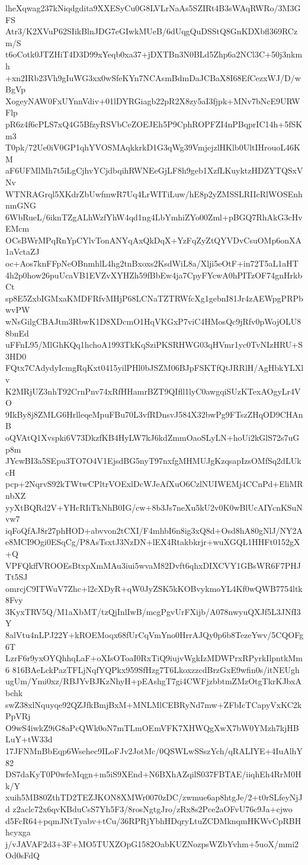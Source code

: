 lheXqwag237kNiqdgdita9XXESyCu0G8LVLrNaAs5SZIRt4B3sWAqRWRo/3M3GFS
Atr3/K2XVuP62SIikBlnJDG7eGIwkMUeB/6dUqgQuDSStQ8GnKDXbfl369RCzm/S
t6oCotk0JTZHiT4D3D99xYeqb0xa37+jDXTBn3N0BLd5Zhp6a2NCl3C+50j3nkmh
+xn2IRb23Vh9gIuWG3xx0wSfeKYn7NCAsmBdmDaJCBaX8I68EfCezxWJ/D/wBgVp
XogeyNAW0FxUYnnVdiv+01lDYRGiagb22pR2X8zy5aI3fjpk+MNv7bNcE9URWFlp
pR6z4f6cPLS7xQ4G5BfzyRSVbCeZOEJEh5P9CphROPFZI4nPBqprIC14h+5fSKm3
T0pk/72Ue0iV0GP1qhYVOSMAqkkrkD1G3qWg39VmjejzlHKlb0UltIHrouoL46KM
aF6UFMlMh7t5iLgCjhvYCjdbqihRWNEeGjLF8h9geb1XzfLKuyktzHDZYTQSxVNv
WTNRAGrql5XKdrZbUwfmwR7Uq4LrWITiLuw/hE8p2yZMSSLRIIcRlWOSEnhnmGNG
6WbRueL/6iknTZgALhWzfYhW4qd1ng4LbYmhiZYo00Zml+pBGQ7RhAkG3cHvEMcm
OCsBWrMPqRnYpCYlvTonANYqAxQkDqX+YzFqZyZtQYVDvCsuOMp6onXA1aVctaZJ
oc+Aos7knFFpNeOBnmhlL4hg2tnBxoxs2KsdWiL8a/Xlji5eOtF+in72T5aL1aHT
4h2p0how26puUcaVB1EVZvXYHZh59fBbEw4ja7CpyFYcwA0hPITzOF74gnHrkbCt
sp8E5ZxbIGMxaKMDFRfvMHjP68LCNaTZTRWfcXg1gebnI81Jr4zAEWpgPRPbwvPW
wNsGilgCBAJtm3RbwK1D8XDcmO1HqVKGxP7viC4HMosQc9jRfv0pWojOLU88bnEd
uFFnL95/MlGhKQq1hchoA1993TkKqSziPKSRHWG03qHVmr1yc0TvNIzHRU+S3HD0
FQtx7CAdydyIcmgRqKxt0415yilPHl0bJSZM06BJpFSKTfQtJRRlH/AgHbkYLXlv
K2MRjUZ3nhT92CrnPnv74xRfHHamrBZT9QIfll1lyC0awgqiSUzKTexAOgyLr4VO
9IkBy8j8ZMLG6HrlleqeMpuFBu70L3vfRDnsvJ584X32bwPg9FTszZHqOD9CHAnB
oQVAtQ1Xvspki6V73DkzfKB4HyLW7kJ6kdZmmOaoSLyLN+hoUi2kGlS72s7uGp8m
JYcwBI3a5SEpu3TO7O4V1EjsdBG5nyT97nxfgMHMUJgKzqsapIzsOMfSq2dLUkcH
pcp+2NqrvS92kTWtwCPltrVOExlDcWJeAfXuO6CzlNUIWEMj4CCnPd+EliMRnbXZ
yyXtBQRd2V+YHcRIiTkNhB0IG/cw+8b3Js7neXu5kU2v0K0wBlUcAIYcnKSuNvw7
iqFoQfAJ8r27phHOD+abvvon2tCXI/F4mhbI6n8ig3xQ8d+Osd8hA80gNlJ/NY2A
e8MCI9Ogi0ESqCg/P8AsTsxtJ3NzDN+lEX4Rtakbkrjr+wuXGQL1HHFt0152gX+Q
VPFQkffVROOEsBtxpXmMAu3iui5wvaM82Dvft6qhxDIXCVY1GBsWR6F7PHJTt5SJ
omrcjC9ITWuV7Zhc+l2cXDyR+qW0JyZSK5kKOBvykmoYL4Kf0wQWB7754ltk8Fvy
3KyxTRV5Q/M1aXbMT/tzQjInlIwB/mcgPgvUrFXijb/A078nwyuQXJf5L3JNfI3Y
8alVtu4nLPJ22Y+kROEMoqx68fUrCqVmYno0HrrAJQy0p6b8TezeYwv/5CQOFg6T
LzrF6r9yxOYQhhqLaF+oXIsOToaI0RxTiQ9iujvWgkIzMDWPrxRPyrkIlpntkMm6
816BAeLckPazTFLjNqfYQPkx959SfHzg7T6LkoxzzcdBrzGxE9wfin0s/itNEUgh
ugUm/Ymi0xz/RBJYvBJKzNhyH+pEAshgT7gi4CWFjzbbtmZMzOtgTkrKJbxAbchk
swZ38xlNquyqe92QZJfkBmjBxM+MNLMlCEBRyNd7mw+ZFbIcTCapyVxKC2kPpVRj
O9wS4iwkZ9iG8aPcQWk0oN7mTLmOEmVFK7XHWQgXwX7bW0YMzh7kjHBLuY+tW33d
17JFNMnBbEqp6Wsehec9ILoFJv2JotMc/0QSWLwSSszYch/qRALIYE+4IuAlhY82
DS7daKyT0P0wfeMqgn+m5iS9XEnd+N6BXhAZqilS037FBTAE/iiqhEh4RrM0Hk/Y
xuih5MB80ZthTD2TEZJKON8XMWr0070zDC/zwmue6ap8htgJe/2+t0rSLfeyNjJd
z2aclc72x6qvKBduCsS7Yh5F3/8rosNgtgJro/zRx8s2Pce2aOFvU76c9Ja+cjwo
d5FcR64+pqmJNtTyabv+tCu/36RPRjYbhHDqryLtuZCDMknqmHKWvCpRBHhcyxga
j/vJAVAF2d3+3F+MO5TUXZOpG1582OabKUZNozpsWZbYvhm+5uoX/mmi2Od0sFdQ
